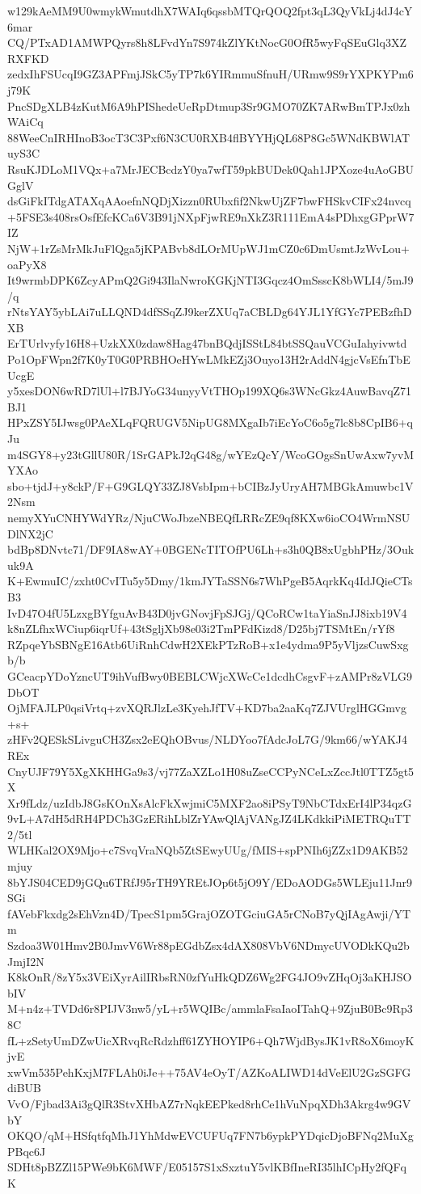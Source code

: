 w129kAeMM9U0wmykWmutdhX7WAIq6qssbMTQrQOQ2fpt3qL3QyVkLj4dJ4cY6mar
CQ/PTxAD1AMWPQyrs8h8LFvdYn7S974kZlYKtNocG0OfR5wyFqSEuGlq3XZRXFKD
zedxIhFSUcqI9GZ3APFmjJSkC5yTP7k6YIRmmuSfnuH/URmw9S9rYXPKYPm6j79K
PncSDgXLB4zKutM6A9hPIShedeUeRpDtmup3Sr9GMO70ZK7ARwBmTPJx0zhWAiCq
88WeeCnIRHInoB3ocT3C3Pxf6N3CU0RXB4flBYYHjQL68P8Gc5WNdKBWlATuyS3C
RsuKJDLoM1VQx+a7MrJECBcdzY0ya7wfT59pkBUDek0Qah1JPXoze4uAoGBUGglV
dsGiFkITdgATAXqAAoefnNQDjXizzn0RUbxfif2NkwUjZF7bwFHSkvCIFx24nvcq
+5FSE3s408rsOsfEfcKCa6V3B91jNXpFjwRE9nXkZ3R111EmA4sPDhxgGPprW7IZ
NjW+1rZsMrMkJuFlQga5jKPABvb8dLOrMUpWJ1mCZ0c6DmUsmtJzWvLou+oaPyX8
It9wrmbDPK6ZcyAPmQ2Gi943IlaNwroKGKjNTI3Gqcz4OmSsscK8bWLI4/5mJ9/q
rNtsYAY5ybLAi7uLLQND4dfSSqZJ9kerZXUq7aCBLDg64YJL1YfGYc7PEBzfhDXB
ErTUrlvyfy16H8+UzkXX0zdaw8Hag47bnBQdjISStL84btSSQauVCGuIahyivwtd
Po1OpFWpn2f7K0yT0G0PRBHOeHYwLMkEZj3Ouyo13H2rAddN4gjcVsEfnTbEUcgE
y5xesDON6wRD7lUl+l7BJYoG34unyyVtTHOp199XQ6s3WNcGkz4AuwBavqZ71BJ1
HPxZSY5IJwsg0PAeXLqFQRUGV5NipUG8MXgaIb7iEcYoC6o5g7lc8b8CpIB6+qJu
m4SGY8+y23tGllU80R/1SrGAPkJ2qG48g/wYEzQcY/WcoGOgsSnUwAxw7yvMYXAo
sbo+tjdJ+y8ckP/F+G9GLQY33ZJ8VsbIpm+bCIBzJyUryAH7MBGkAmuwbc1V2Nsm
nemyXYuCNHYWdYRz/NjuCWoJbzeNBEQfLRRcZE9qf8KXw6ioCO4WrmNSUDlNX2jC
bdBp8DNvtc71/DF9IA8wAY+0BGENcTITOfPU6Lh+s3h0QB8xUgbhPHz/3Oukuk9A
K+EwmuIC/zxht0CvITu5y5Dmy/1kmJYTaSSN6s7WhPgeB5AqrkKq4IdJQieCTsB3
IvD47O4fU5LzxgBYfguAvB43D0jvGNovjFpSJGj/QCoRCw1taYiaSnJJ8ixb19V4
k8nZLfhxWCiup6iqrUf+43tSgljXb98e03i2TmPFdKizd8/D25bj7TSMtEn/rYf8
RZpqeYbSBNgE16Atb6UiRnhCdwH2XEkPTzRoB+x1e4ydma9P5yVljzsCuwSxgb/b
GCeacpYDoYzncUT9ihVufBwy0BEBLCWjcXWcCe1dcdhCsgvF+zAMPr8zVLG9DbOT
OjMFAJLP0qsiVrtq+zvXQRJlzLe3KyehJfTV+KD7ba2aaKq7ZJVUrglHGGmvg+s+
zHFv2QESkSLivguCH3Zsx2eEQhOBvus/NLDYoo7fAdcJoL7G/9km66/wYAKJ4REx
CnyUJF79Y5XgXKHHGa9s3/vj77ZaXZLo1H08uZseCCPyNCeLxZccJtl0TTZ5gt5X
Xr9fLdz/uzIdbJ8GsKOnXsAlcFkXwjmiC5MXF2ao8iPSyT9NbCTdxErI4lP34qzG
9vL+A7dH5dRH4PDCh3GzERihLblZrYAwQlAjVANgJZ4LKdkkiPiMETRQuTT2/5tl
WLHKal2OX9Mjo+c7SvqVraNQb5ZtSEwyUUg/fMIS+spPNIh6jZZx1D9AKB52mjuy
8bYJS04CED9jGQu6TRfJ95rTH9YREtJOp6t5jO9Y/EDoAODGs5WLEju11Jnr9SGi
fAVebFkxdg2sEhVzn4D/TpecS1pm5GrajOZOTGciuGA5rCNoB7yQjIAgAwji/YTm
Szdoa3W01Hmv2B0JmvV6Wr88pEGdbZsx4dAX808VbV6NDmycUVODkKQu2bJmjI2N
K8kOnR/8zY5x3VEiXyrAilIRbsRN0zfYuHkQDZ6Wg2FG4JO9vZHqOj3aKHJSObIV
M+n4z+TVDd6r8PIJV3nw5/yL+r5WQIBc/ammlaFsaIaoITahQ+9ZjuB0Bc9Rp38C
fL+zSetyUmDZwUicXRvqRcRdzhff61ZYHOYIP6+Qh7WjdBysJK1vR8oX6moyKjvE
xwVm535PehKxjM7FLAh0iJe++75AV4eOyT/AZKoALIWD14dVeElU2GzSGFGdiBUB
VvO/Fjbad3Ai3gQlR3StvXHbAZ7rNqkEEPked8rhCe1hVuNpqXDh3Akrg4w9GVbY
OKQO/qM+HSfqtfqMhJ1YhMdwEVCUFUq7FN7b6ypkPYDqicDjoBFNq2MuXgPBqc6J
SDHt8pBZZl15PWe9bK6MWF/E05157S1xSxztuY5vlKBfIneRI35lhICpHy2fQFqK
